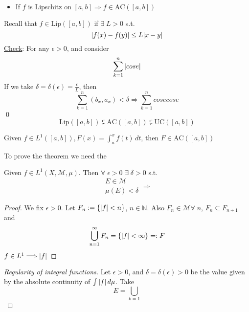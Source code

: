 \begin{itemize}
    \item If \(f\) is Lipschitz on \([a,b] \Longrightarrow f \in \text{AC}([a,b])\) 
\end{itemize}
Recall that \(f \in \mbox{Lip}([a,b])\) if \(\exists \; L > 0\) s.t. 
\[
    \abs{f(x) - f(y)} \leq L\abs{x-y}
\]
\underline{Check}: For any \(\epsilon > 0\), and consider 
\[
    \sum_{k=1}^n \abs{ cose}
\]
If we take \(\delta = \delta(\epsilon) = \frac{\epsilon}{L}\), then 
\[
    \sum_{k=1}^n (b_x, a_x) < \delta \Longrightarrow \sum_{k=1}^n cose cose
\]
\qed
\[
    \mbox{Lip}([a,b]) \subsetneqq \mbox{AC}([a,b]) \subsetneqq \mbox{UC}([a,b])
\]
\begin{theorem}
    Given \(f \in L^1([a,b]), F(x) = \int_a^xf(t) \, dt\), then \(F \in \mbox{AC}([a,b])\)
\end{theorem}
To prove the theorem we need the
\begin{theorem}
    Given \(f \in L^1(X, \mathcal{M}, \mu)\). Then \(\forall \; \epsilon >0 \) \(\exists \; \delta > 0\) s.t.     
    \[
        \begin{array}{l}
            E \in \mathcal{M} \\
            \mu(E) < \delta
        \end{array} \Longrightarrow 
    \]
\end{theorem}
\begin{proof}
    We fix \(\epsilon > 0\). Let \(F_n := \left\{ \abs{f} < n \right\}\), \(n \in \mathbb{N}\). Also \(F_n \in \mathcal{M} \forall \; n\), \(F_n \subseteq F_{n+1}\) and 
    \[
        \bigcup_{n=1}^{\infty} F_n = \left\{ \abs{f} < \infty \right\} =: F
    \]
    \(f \in L^1 \Longrightarrow \abs{f}\)
\end{proof}
\begin{proof}[Regularity of integral functions]
    Let \(\epsilon > 0\), and \(\delta = \delta(\epsilon) > 0\) be the value given by the absolute continuity of \(\int \abs{f} \, d\mu\). 
    Take 
    \[
        E = \bigcup_{k=1}
    \]
\end{proof}